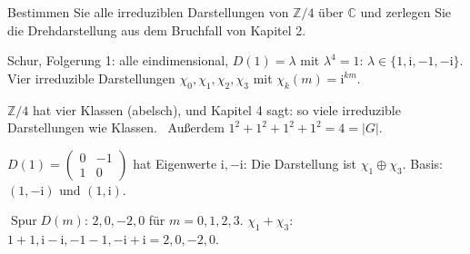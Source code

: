 \begin{aufgabe}
Bestimmen Sie alle irreduziblen Darstellungen von $\mathbb Z/4$ über $\mathbb C$ und zerlegen Sie die Drehdarstellung aus dem Bruchfall von Kapitel 2.

\loesung
{}
Schur, Folgerung 1: alle eindimensional, $D(1) = \lambda$ mit $\lambda^{4} = 1$: $\lambda\in\{1, \mathrm i, -1, -\mathrm i\}$. Vier irreduzible Darstellungen $\chi_0, \chi_1, \chi_2, \chi_3$ mit $\chi_k(m) = \mathrm i^{km}$.

$\mathbb Z/4$ hat vier Klassen (abelsch), und Kapitel 4 sagt: so viele irreduzible Darstellungen wie Klassen. \checkmark\ Außerdem $1^{2} + 1^{2} + 1^{2} + 1^{2} = 4 = |G|$. \checkmark

$D(1) = \begin{pmatrix}0 & -1\\ 1 & 0\end{pmatrix}$ hat Eigenwerte $\mathrm i, -\mathrm i$: Die Darstellung ist $\chi_1\oplus\chi_3$. Basis: $(1, -\mathrm i)$ und $(1, \mathrm i)$.

$\operatorname{Spur}D(m)$: $2, 0, -2, 0$ für $m = 0, 1, 2, 3$. $\chi_1 + \chi_3$: $1 + 1, \mathrm i - \mathrm i, -1 - 1, -\mathrm i + \mathrm i = 2, 0, -2, 0$. \checkmark

\begin{center}
\begin{minipage}{0.88\textwidth}
\end{minipage}
\end{center}
\end{aufgabe}

